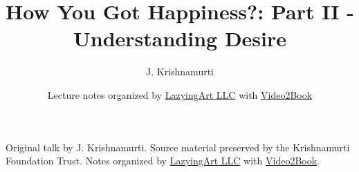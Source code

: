 \documentclass[11pt,oneside]{book}
\begin{document}
\frontmatter
\title{How You Got Happiness?: Part II - Understanding Desire}
\author{J. Krishnamurti}
\date{Lecture notes organized by \href{https://lazying.art}{LazyingArt LLC} with \href{https://github.com/lachlanchen/Video2Book}{Video2Book}}
\maketitle
\begin{center}
\small Original talk by J. Krishnamurti. Source material preserved by the Krishnamurti Foundation Trust. Notes organized by \href{https://lazying.art}{LazyingArt LLC} with \href{https://github.com/lachlanchen/Video2Book}{Video2Book}.
\end{center}
\clearpage
\mainmatter

\end{document}
